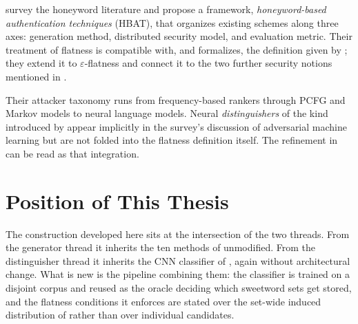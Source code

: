 \textcite{chakraborty2022hbat} survey the honeyword literature and
propose a framework, \emph{honeyword-based authentication techniques}
(HBAT), that organizes existing schemes along three axes: generation
method, distributed security model, and evaluation metric. Their
treatment of flatness is compatible with, and formalizes, the definition
given by \textcite{juels2013honeywords}; they extend it to
$\varepsilon$-flatness and connect it to the two further security
notions mentioned in .

Their attacker taxonomy runs from frequency-based rankers through PCFG
and Markov models to neural language models. Neural
\emph{distinguishers} of the kind introduced by
\textcite{dani2024passfilter} appear implicitly in the survey's
discussion of adversarial machine learning but are not folded into the
flatness definition itself. The refinement in
 can be read as that integration.

\section{Position of This Thesis}
\label{sec:related-position}

The construction developed here sits at the intersection of the two
threads. From the generator thread it inherits the ten methods of
 unmodified. From the distinguisher thread it
inherits the CNN classifier of \textcite{dani2024passfilter}, again
without architectural change. What is new is the pipeline combining
them: the classifier is trained on a disjoint corpus and reused as the
oracle deciding which sweetword sets get stored, and the flatness
conditions it enforces are stated over the set-wide induced distribution
of  rather than over individual candidates.

